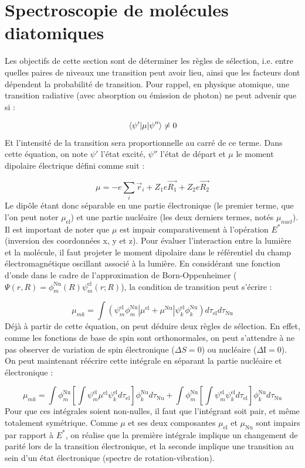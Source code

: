\section{Spectroscopie de molécules diatomiques}

Les objectifs de cette section sont de déterminer les règles de sélection, i.e. entre quelles paires de niveaux une transition peut avoir lieu, ainsi que les facteurs dont dépendent la probabilité de transition. Pour rappel, en physique atomique, une transition radiative (avec absorption ou émission de photon) ne peut advenir que si :

\[ \mel{\psi'}{\mu}{\psi''} \neq 0 \]
Et l'intensité de la transition sera proportionnelle au carré de ce terme.
Dans cette équation, on note $\psi'$ l'état excité, $\psi''$ l'état de départ et $\mu$ le moment dipolaire électrique défini comme suit :

\[
    \mu = -e\sum\limits_i\Vec{r}_i + Z_1e\Vec{R_1} + Z_2e\Vec{R_2}
\]
Le dipôle étant donc séparable en une partie électronique (le premier terme, que l'on peut noter $\mu_\text{el}$) et une partie nucléaire (les deux derniers termes, notés $\mu_{nucl}$). Il est important de noter que $\mu$ est impair comparativement à l'opération $E^*$ (inversion des coordonnées x, y et z).
Pour évaluer l'interaction entre la lumière et la molécule, il faut projeter le moment dipolaire dans le référentiel du champ électromagnétique oscillant associé à la lumière. En considérant une fonction d'onde dans le cadre de l'approximation de Born-Oppenheimer ($\Psi(r,R) = \phi^\text{Nu}_m(R)\psi^\text{el}_m(r;R)$), la condition de transition peut s'écrire :

\[
    \mu_{mk} = \int (\psi^\text{el}_m\phi^\text{Nu}_m|\mu^\text{el} + \mu^\text{Nu}|\psi^\text{el}_k\phi^\text{Nu}_k)d\tau_\text{el}d\tau_\text{Nu}
\]
Déjà à partir de cette équation, on peut déduire deux règles de sélection. En effet, comme les fonctions de base de spin sont orthonormales, on peut s'attendre à ne pas observer de variation de spin électronique ($\Delta S = 0$) ou nucléaire ($\Delta $I$ =0$). On peut maintenant réécrire cette intégrale en séparant la partie nucléaire et électronique :

\[
    \mu_{mk} = \int \phi^\text{Nu}_m\left[\int \psi^\text{el}_m\mu^\text{el}\psi^\text{el}_kd\tau_\text{el} \right]\phi^\text{Nu}_kd\tau_\text{Nu} + \int \phi^\text{Nu}_m\left[\int \psi^\text{el}_m\psi^\text{el}_kd\tau_\text{el} \right]\phi^\text{Nu}_kd\tau_\text{Nu}
\]
Pour que ces intégrales soient non-nulles, il faut que l'intégrant soit pair, et même totalement symétrique. Comme $\mu$ et ses deux composantes $\mu_\text{el}$ et $\mu_\text{Nu}$ sont impairs par rapport à $E^*$, on réalise que la première intégrale implique un changement de parité lors de la transition électronique, et la seconde implique une transition au sein d'un état électronique (spectre de rotation-vibration).



